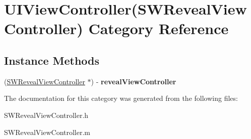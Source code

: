 \hypertarget{category_u_i_view_controller_07_s_w_reveal_view_controller_08}{}\section{U\+I\+View\+Controller(S\+W\+Reveal\+View\+Controller) Category Reference}
\label{category_u_i_view_controller_07_s_w_reveal_view_controller_08}
\subsection*{Instance Methods}
\begin{DoxyCompactItemize}
\item 
\mbox{\label{category_u_i_view_controller_07_s_w_reveal_view_controller_08_aaa9a95636a9031f617e7ae52e06af44c}} 
(\hyperlink{interface_s_w_reveal_view_controller}{S\+W\+Reveal\+View\+Controller} $\ast$) -\/ {\bfseries reveal\+View\+Controller}
\end{DoxyCompactItemize}


The documentation for this category was generated from the following files\+:\begin{DoxyCompactItemize}
\item 
S\+W\+Reveal\+View\+Controller.\+h\item 
S\+W\+Reveal\+View\+Controller.\+m\end{DoxyCompactItemize}
